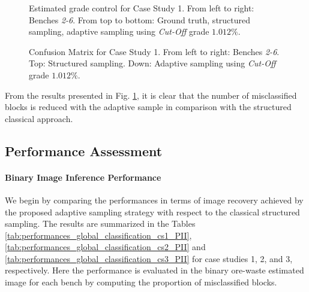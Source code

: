 \begin{figure}
	\centering
	\caption{\label{fig:CS1_1012_GC_PII} Estimated grade control for Case Study 1. From left to right: Benches \emph{2-6}. From top to bottom: Ground truth, structured sampling,  adaptive sampling using \emph{Cut-Off} grade $1.012\%$.}
	
	\centering
	\hspace{5cm}
	
	\caption{\label{fig:CS1_1012_CC_PII} Confusion Matrix for Case Study 1. From left to right: Benches \emph{2-6}. Top: Structured sampling. Down: Adaptive sampling using \emph{Cut-Off} grade $1.012\%$.}
\end{figure}

From the results presented in Fig. \ref{fig:CS1_1012_CC_PII}, it is clear that the number of misclassified blocks is reduced with the adaptive sample in comparison with the structured classical approach.

























\clearpage
\newpage
\subsection{Performance Assessment}

\paragraph{Binary Image Inference Performance}

We begin by comparing the performances in terms of image recovery achieved by the proposed adaptive sampling strategy with respect to the classical structured sampling. The results are summarized in the Tables \ref{tab:performances_global_classification_cs1_PII}, \ref{tab:performances_global_classification_cs2_PII} and \ref{tab:performances_global_classification_cs3_PII} for case studies 1, 2, and 3, respectively. Here the performance is evaluated in the binary ore-waste estimated image for each bench by computing the proportion of  misclassified blocks. 


